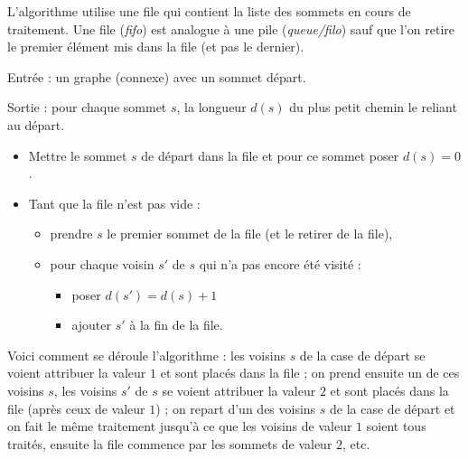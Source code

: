 \documentclass[11pt,class=report,crop=false]{standalone}
\begin{document}
L'algorithme utilise une file qui contient la liste des sommets en cours de traitement.
Une file (\emph{fifo}) est analogue à une pile (\emph{queue/filo}) sauf que l'on retire le premier élément mis dans la file (et pas le dernier).


\begin{algorithme}
			
Entrée : un graphe (connexe) avec un sommet \og{}départ\fg{}.

Sortie  : pour chaque sommet $s$, la longueur $d(s)$ du plus petit chemin le reliant au départ.

\begin{itemize}
	\item Mettre le sommet $s$ de \og{}départ\fg{} dans la file et pour ce sommet poser $d(s) = 0$.
	
	\item Tant que la file n'est pas vide :
	\begin{itemize}
		\item prendre $s$ le premier sommet de la file (et le retirer de la file),
		\item pour chaque voisin $s'$ de $s$ qui n'a pas encore été visité :
		\begin{itemize}
			\item poser $d(s') = d(s)+1$
			\item ajouter $s'$ à la fin de la file.
		\end{itemize}
	\end{itemize}	
	
\end{itemize}  
\end{algorithme}


Voici comment se déroule l'algorithme :
les voisins $s$ de la case de départ se voient attribuer la valeur $1$ et sont placés dans la file ; 
on prend ensuite un de ces voisins $s$, les voisins $s'$ de $s$ se voient attribuer la valeur $2$ et sont placés dans la file (après ceux de valeur $1$) ;
on repart d'un des voisins $s$ de la case de départ et on fait le même traitement jusqu'à ce que les voisins de valeur $1$ soient tous traités, ensuite la file commence par les sommets de valeur $2$, etc.

\end{document}
